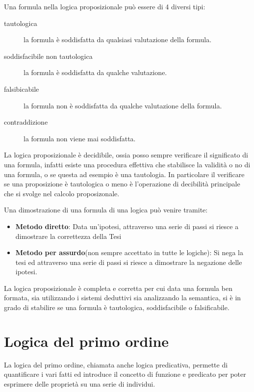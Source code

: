 \documentclass[a4paper]{book}
\begin{document}
Una formula nella logica proposizionale può essere di 4 diversi tipi:
\begin{description}
    \item[tautologica] la formula è soddisfatta da qualsiasi valutazione della formula.
    \item[soddisfacibile non tautologica] la formula è soddisfatta da qualche valutazione.
    \item[falsibicabile] la formula non è soddisfatta da qualche valutazione della formula.
    \item[contraddizione] la formula non viene mai soddisfatta.
\end{description}

La logica proposizionale è decidibile, ossia posso sempre verificare il significato di una formula, infatti esiste
una procedura effettiva che stabilisce la validità o no di una formula, o se questa ad esempio è una tautologia.\newline
In particolare il verificare se una proposizione è tautologica o meno è l’operazione di decibilità principale che si svolge
nel calcolo proposizonale.

Una dimostrazione di una formula di una logica può venire tramite:
\begin{itemize}
  \item  \textbf{Metodo diretto}: Data un'ipotesi, attraverso una serie di passi
          si riesce a dimostrare la correttezza della Tesi
  \item \textbf{Metodo per assurdo}(non sempre accettato in tutte le logiche):
        Si nega la tesi ed attraverso una serie di passi si riesce a dimostrare
        la negazione delle ipotesi.
\end{itemize}

La logica proposizionale è completa e corretta per cui data una formula ben formata, sia utilizzando i sistemi deduttivi sia analizzando
la semantica, si è in grado di stabilire se una formula è tautologica, soddisfacibile o falsificabile.

\section{Logica del primo ordine}
La logica del primo ordine, chiamata anche logica predicativa, permette di quantificare i vari fatti ed introduce il concetto di funzione e
predicato per poter esprimere delle proprietà su una serie di individui.
\end{document}
